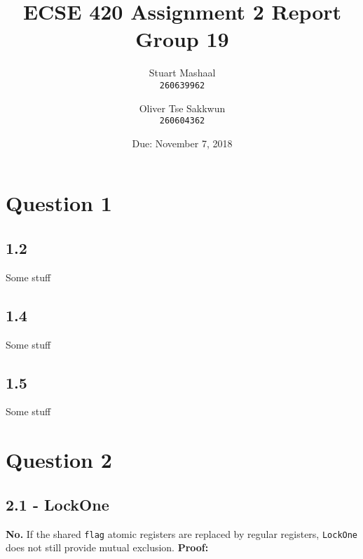 \documentclass[11pt, letterpaper]{article}
\title{ECSE 420 Assignment 2 Report\\Group 19}
\author{
    Stuart Mashaal\\
    \texttt{260639962}
    \and
    Oliver Tse Sakkwun\\
    \texttt{260604362}
}
\date{Due: November 7, 2018}
\newcommand{\code}[1] { \texttt{#1} }
\begin{document}
\begin{titlepage}
    \maketitle
    \thispagestyle{empty}
    \setcounter{page}{0}
\end{titlepage}

\section*{Question 1}
\label{sec:question_1}

\subsection*{1.2}
\label{sub:1_2}

Some stuff

\subsection*{1.4}
\label{sub:1_4}

Some stuff

\subsection*{1.5}
\label{sub:1_5}

Some stuff

\newpage
\section*{Question 2}
\label{sec:question_2}

\subsection*{2.1 - LockOne}
\label{sub:2_1_lockone}

\textbf{No.} If the shared \code{flag} atomic registers are replaced by regular registers, \code{LockOne} does not still provide mutual exclusion. \textbf{Proof:}
\end{document}
